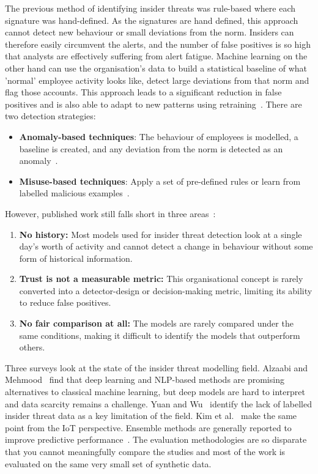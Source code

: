\documentclass[a4paper,12pt]{article}
\begin{document}
The previous method of identifying insider threats was rule-based where each signature was hand-defined. As the signatures are hand defined, this approach cannot detect new behaviour or small deviations from the norm. Insiders can therefore easily circumvent the alerts, and the number of false positives is so high that analysts are effectively suffering from alert fatigue. Machine learning on the other hand can use the organisation's data to build a statistical baseline of what 'normal' employee activity looks like, detect large deviations from that norm and flag those accounts. This approach leads to a significant reduction in false positives and is also able to adapt to new patterns using retraining~\cite{liu2018}. There are two detection strategies:

\begin{itemize}
  \item \textbf{Anomaly-based techniques}: The behaviour of employees is modelled, a baseline is created, and any deviation from the norm is detected as an anomaly~\cite{ibraheem2025}.
  \item \textbf{Misuse-based techniques}: Apply a set of pre-defined rules or learn from labelled malicious examples~\cite{liu2018,gheyas2016}.
\end{itemize}
However, published work still falls short in three areas~\cite{joubert2024}:

\begin{enumerate}
  \item \textbf{No history:} Most models used for insider threat detection look at a single day's worth of activity and cannot detect a change in behaviour without some form of historical information.
  \item \textbf{Trust is not a measurable metric:} This organisational concept is rarely converted into a detector-design or decision-making metric, limiting its ability to reduce false positives.
  \item \textbf{No fair comparison at all:} The models are rarely compared under the same conditions, making it difficult to identify the models that outperform others.
\end{enumerate}
Three surveys look at the state of the insider threat modelling field. Alzaabi and Mehmood~\cite{alzaabi2024} find that deep learning and NLP-based methods are promising alternatives to classical machine learning, but deep models are hard to interpret and data scarcity remains a challenge. Yuan and Wu~\cite{yuan2021} identify the lack of labelled insider threat data as a key limitation of the field. Kim et al.~\cite{kim2020} make the same point from the IoT perspective. Ensemble methods are generally reported to improve predictive performance~\cite{alzaabi2024}. The evaluation methodologies are so disparate that you cannot meaningfully compare the studies and most of the work is evaluated on the same very small set of synthetic data.
\end{document}

